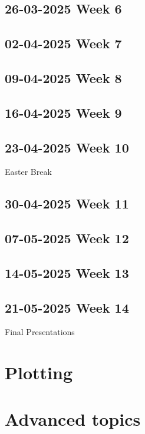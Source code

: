 \documentclass{article}
\begin{document}
\subsection*{26-03-2025 \textbf{Week 6}}
\subsection*{02-04-2025 \textbf{Week 7}}
\subsection*{09-04-2025 \textbf{Week 8}}
\subsection*{16-04-2025 \textbf{Week 9}}
\subsection*{23-04-2025 \textbf{Week 10}}
Easter Break

\subsection*{30-04-2025 \textbf{Week 11}}
\subsection*{07-05-2025 \textbf{Week 12}}
\subsection*{14-05-2025 \textbf{Week 13}}
\subsection*{21-05-2025 \textbf{Week 14}}
Final Presentations

\section{Plotting}

\section{Advanced topics}
\end{document}
